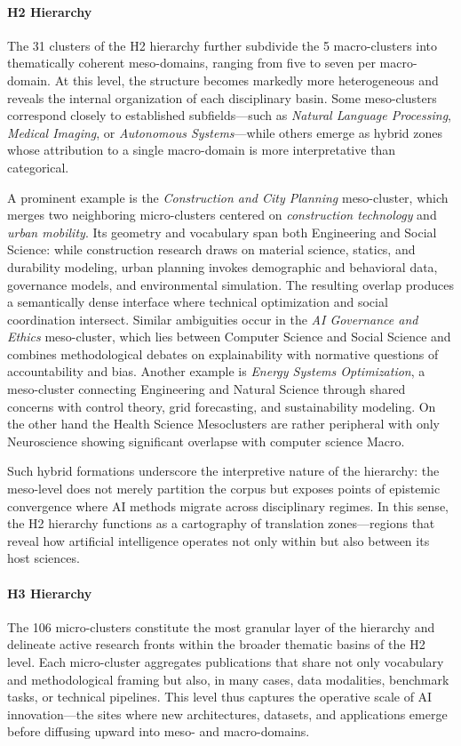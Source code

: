 \documentclass{article}
\begin{document}
\paragraph{H2 Hierarchy}
The 31 clusters of the H2 hierarchy further subdivide the 5 macro-clusters into thematically coherent meso-domains, ranging from five to seven per macro-domain. At this level, the structure becomes markedly more heterogeneous and reveals the internal organization of each disciplinary basin. Some meso-clusters correspond closely to established subfields—such as \emph{Natural Language Processing}, \emph{Medical Imaging}, or \emph{Autonomous Systems}—while others emerge as hybrid zones whose attribution to a single macro-domain is more interpretative than categorical. 

A prominent example is the \emph{Construction and City Planning} meso-cluster, which merges two neighboring micro-clusters centered on \emph{construction technology} and \emph{urban mobility}. Its geometry and vocabulary span both Engineering and Social Science: while construction research draws on material science, statics, and durability modeling, urban planning invokes demographic and behavioral data, governance models, and environmental simulation. The resulting overlap produces a semantically dense interface where technical optimization and social coordination intersect. Similar ambiguities occur in the \emph{AI Governance and Ethics} meso-cluster, which lies between Computer Science and Social Science and combines methodological debates on explainability with normative questions of accountability and bias. Another example is \emph{Energy Systems Optimization}, a meso-cluster connecting Engineering and Natural Science through shared concerns with control theory, grid forecasting, and sustainability modeling. On the other hand the Health Science Mesoclusters are rather peripheral with only Neuroscience showing significant overlapse with computer science Macro.

Such hybrid formations underscore the interpretive nature of the hierarchy: the meso-level does not merely partition the corpus but exposes points of epistemic convergence where AI methods migrate across disciplinary regimes. In this sense, the H2 hierarchy functions as a cartography of translation zones—regions that reveal how artificial intelligence operates not only within but also between its host sciences.


\paragraph{H3 Hierarchy}
The 106 micro-clusters constitute the most granular layer of the hierarchy and delineate active research fronts within the broader thematic basins of the H2 level. Each micro-cluster aggregates publications that share not only vocabulary and methodological framing but also, in many cases, data modalities, benchmark tasks, or technical pipelines. This level thus captures the operative scale of AI innovation—the sites where new architectures, datasets, and applications emerge before diffusing upward into meso- and macro-domains.
\end{document}
